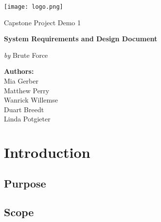 \documentclass[12pt,a4paper]{article}
\begin{document}
   \begin{titlepage}
      {\selectfont
      	\centering
      	\texttt{[image: logo.png]}\par\vspace{1cm}
      	{\LARGE Capstone Project Demo 1 \par}
      	\vspace{0.25cm}
      	{\huge\bfseries \color{cyan}System Requirements and Design Document\par}
      	\vspace{1cm}
      	{\Large\textit{by} Brute Force\par}
         \vspace{0.25cm}

         \par\vspace{1cm}
         \date{}
         \author{}
         \title{}
         \centering
         \textbf{Authors:}\\
         Mia Gerber\\
         Matthew Perry\\
         Wanrick Willemse\\
         Duart Breedt\\
         Linda Potgieter\\
      }
   \end{titlepage}
   \maketitle
   \tableofcontents
   \newpage

   \section{Introduction}
   	\subsection{Purpose}
   	
   	\subsection{Scope}
   	
\end{document}

